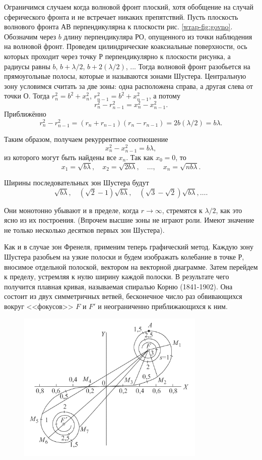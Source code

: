 \documentclass[a4paper,14pt]{article}
\begin{document}
Ограничимся случаем когда волновой фронт плоский, хотя обобщение на случай сферического фронта и не встречает никаких препятствий. Пусть плоскость волнового фронта АВ перпендикулярна к плоскости рис. \ref{wrap-fig:govno}. Обозначим через $b$ длину перпендикуляра $РО$, опущенного из точки наблюдения на волновой фронт. Проведем цилиндрические коаксиальные поверхности, ось которых проходит через точку Р перпендикулярно к плоскости рисунка, а радиусы равны $b$, $b+\lambda/2$, $b+2(\lambda/2)$, ...
Тогда волновой фронт разобьется на прямоугольные полосы, которые и называются зонами Шустера. Центральную зону условимся считать за две зоны: одна расположена справа, а другая слева от точки $О$. 
Тогда \( r_n^2 = b^2 + x_n^2 \), \( r_{n-1}^2 = b^2 + x_{n-1}^2 \), а потому
\[
r_n^2 - r_{n-1}^2 = x_n^2 - x_{n-1}^2.
\]
Приближённо
\[
r_n^2 - r_{n-1}^2 = (r_n + r_{n-1})(r_n - r_{n-1}) = 2b(\lambda/2) = b\lambda.
\]

Таким образом, получаем рекуррентное соотношение
\[
x_n^2 - x_{n-1}^2 = b\lambda,
\]
из которого могут быть найдены все \( x_n \). Так как \( x_0 = 0 \), то
\[
x_1 = \sqrt{b\lambda}, \quad x_2 = \sqrt{2b\lambda}, \quad \dots, \quad x_n = \sqrt{nb\lambda}.
\]

Ширины последовательных зон Шустера будут
\[
\sqrt{b\lambda}, \quad (\sqrt{2} - 1)\sqrt{b\lambda}, \quad (\sqrt{3} - \sqrt{2})\sqrt{b\lambda}, \dots.
\]

Они монотонно убывают и в пределе, когда \( r \to \infty \), стремятся к \(\lambda/2\), как это ясно из их построения. (Впрочем высшие зоны не играют роли. Имеют значение не только несколько десятков первых зон Шустера).

Как и в случае зон Френеля, применим теперь графический метод. Каждую зону Шустера разобьем на узкие полоски и будем изображать колебание в точке Р, вносимое отдельной полоской, вектором на векторной диаграмме. Затем перейдем к пределу, устремляя к нулю ширину каждой полоски. В результате чего получится плавная кривая, называемая спиралью Корню (1841-1902). Она состоит из двух симметричных ветвей, бесконечное число раз обвивающихся вокруг <<фокусов>> $F$ и $F'$ и неограниченно приближающихся к ним. 

\begin{figure}[h]
    \centering
    \includegraphics[width = 0.8\textwidth]{korny.png}
    \caption{}\label{fig:spiral_korny}
\end{figure}
\end{document}
